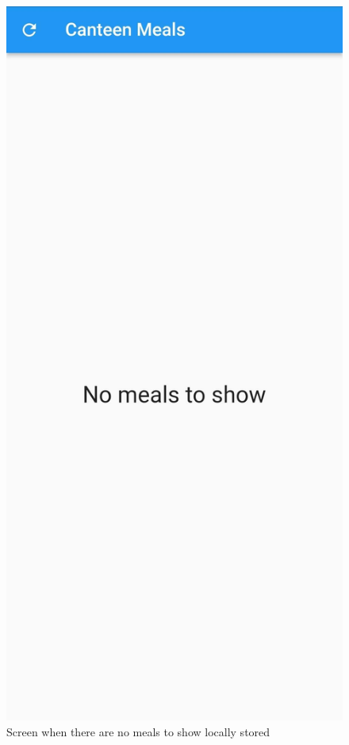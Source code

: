 \documentclass[10pt]{article}
\begin{document}
	\begin{figure}[H]
		\centering
		\includegraphics[scale=0.10]{imgs/no_meals_to_show.jpg}
		\caption{Screen when there are no meals to show locally stored}\label{fig:usage}
	\end{figure}
\end{document}
